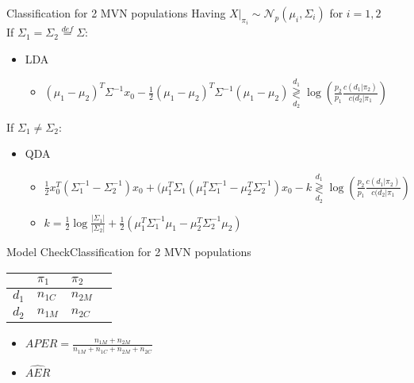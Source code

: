 \documentclass[aspectratio=169,10pt,t]{beamer}
\newcommand\gldec[2]{
	\underset{#2}{\overset{#1}{\gtrless}}
}
\begin{document}
\begin{frame}{Classification for 2 MVN populations}
    Having $X|_{\pi_i} \sim \mathcal{N}_p(\mu_i, \Sigma_i)$ for $i = 1, 2$ \\
    If $\Sigma_1 = \Sigma_2 \overset{def}{=} \Sigma$:
		\pause
    \begin{itemize}
        \item LDA
        \begin{itemize}
            \item $(\mu_1 - \mu_2)^T \Sigma^{-1}x_0 - \frac{1}{2}(\mu_1 - \mu_2)^T \Sigma^{-1}(\mu_1 - \mu_2)  \gldec{d_1}{d_2} \log(\frac{p_2}{p_1} \frac{c(d_1 | \pi_2)}{c(d_2 | \pi_1})$
        \end{itemize}
    \end{itemize}
		\pause
    If $\Sigma_1 \neq \Sigma_2$:
    \begin{itemize}
        \item QDA
        \begin{itemize}
            \item $
							\frac{1}{2} x_0^T(\Sigma_1^{-1} - \Sigma_2^{-1})x_0 + (\mu_1^T\Sigma_1
							\left( \mu_1^{T} \Sigma^{-1}_{1} - \mu_2^{T} \Sigma^{-1}_{2}  \right) x_0 -k
							\gldec{d_1}{d_2}
							\log(\frac{p_2}{p_1} \frac{c(d_1 | \pi_2)}{c(d_2 | \pi_1})
							$
						\item $
							k = \frac{1}{2}  \log \frac{| \Sigma_1 |}{| \Sigma_2 |} +
							\frac{1}{2}  \left( 
								\mu_1^{T}\Sigma_1^{-1}\mu_1
								-
								\mu_2^{T}\Sigma_2^{-1}\mu_2
								 \right) 
							$
        \end{itemize}
    \end{itemize}
\end{frame}

\begin{frame}{Model Check}{Classification for 2 MVN populations}
        \begin{table}[h]
        \begin{tabular}{@{}llll@{}}
        \toprule
              & $\pi_1$          & $\pi_2$          \\ \midrule
        $d_1$ & $n_{1C}$ & $n_{2M}$ \\
        $d_2$ & $n_{1M}$ & $n_{2C}$ \\ \midrule 
        \end{tabular}
        \end{table}
				\pause
    \begin{itemize}
        \item $APER = \frac{n_{1M} + n_{2M}}{n_{1M} + n_{1C} + n_{2M} + n_{2C}}$
    \end{itemize}
    \begin{itemize}
        \item $\hat{AER}$ 
    \end{itemize}
\end{frame}
\end{document}
